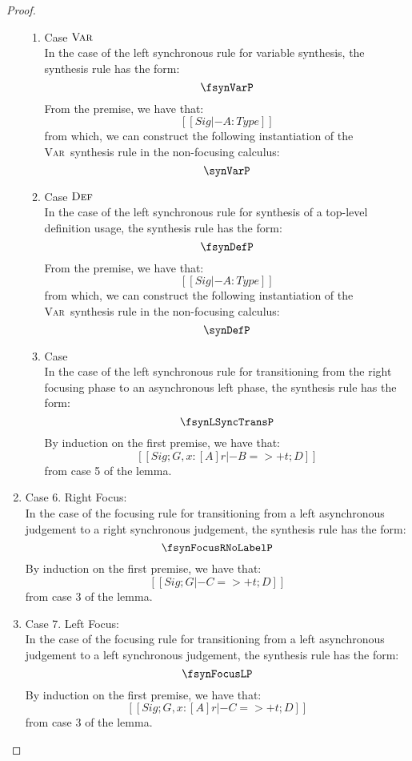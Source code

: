 \begin{proof}
\begin{enumerate}
\begin{enumerate}
        \item Case $\textsc{Var}$ \\
          In the case of the left synchronous rule for variable synthesis, the synthesis rule has the form:
            \[
            \fsynVarP
            \]
            From the premise, we have that: 
            \[
            [[ Sig |- A : Type ]]   
            \]
            from which, we can construct the following instantiation of the \textsc{Var}\ synthesis rule in the non-focusing calculus:
            \[
              \synVarP
            \]
        \item Case $\textsc{Def}$ \\
          In the case of the left synchronous rule for synthesis of a top-level definition usage, the synthesis rule has the form:
            \[
            \fsynDefP
            \]
            From the premise, we have that: 
            \[
            [[ Sig |- A : Type ]]   
            \]
            from which, we can construct the following instantiation of the \textsc{Var}\ synthesis rule in the non-focusing calculus:
            \[
              \synDefP
            \]
          \item Case \fsynLSyncTransName \\
            In the case of the left synchronous rule for transitioning from the right focusing phase to an asynchronous left phase, the synthesis rule has the form:
            \[
              \fsynLSyncTransP
            \]
            By induction on the first premise, we have that:
            \[
              [[  Sig ; G, x : [A ] r |- B =>+ t ; D ]] \tag{ih}
            \]
            from case 5 of the lemma.
      \end{enumerate}
  \item Case 6. Right Focus: \\
            In the case of the focusing rule for transitioning from a left asynchronous judgement to a right synchronous judgement, the synthesis rule has the form:
            \[
              \fsynFocusRNoLabelP
            \]
            By induction on the first premise, we have that:
            \[
              [[  Sig ; G |- C =>+ t ; D ]] \tag{ih}
            \]
            from case 3 of the lemma.
  \item Case 7. Left Focus: \\
            In the case of the focusing rule for transitioning from a left asynchronous judgement to a left synchronous judgement, the synthesis rule has the form:
            \[
              \fsynFocusLP
            \]
            By induction on the first premise, we have that:
            \[
              [[  Sig; G, x :  [A] r |- C =>+ t ; D ]] \tag{ih}
            \]
            from case 3 of the lemma.
  \end{enumerate}
  \end{proof}